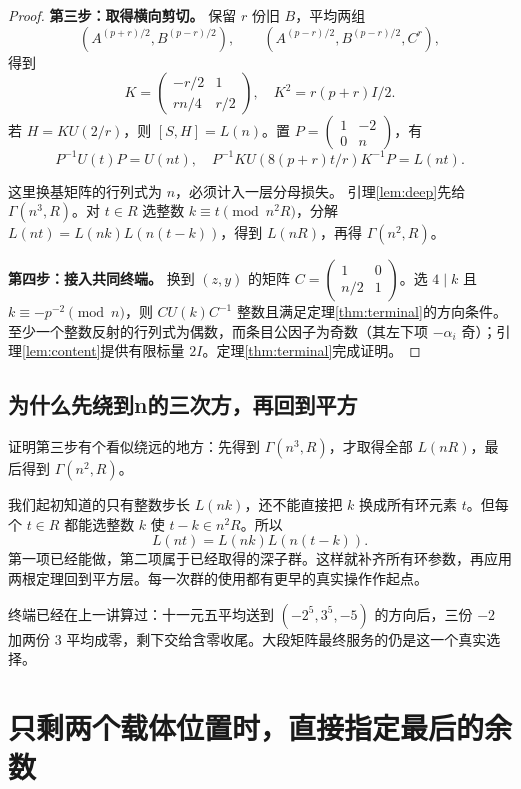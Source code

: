 \documentclass[11pt,a4paper,oneside,openany]{book}
\theoremstyle{definition}
\numberwithin{equation}{chapter}
\begin{document}
\begin{proof}
\par\noindent\textbf{第三步：取得横向剪切。}
保留 $r$ 份旧 $B$，平均两组
\[
(A^{(p+r)/2},B^{(p-r)/2}),\qquad
(A^{(p-r)/2},B^{(p-r)/2},C^r),
\]
得到
\[
K=\begin{pmatrix}-r/2&1\\rn/4&r/2\end{pmatrix},\quad K^2=r(p+r)I/2.
\]
若 $H=KU(2/r)$，则 $[S,H]=L(n)$。置 $P=\left(\begin{smallmatrix}1&-2\\0&n\end{smallmatrix}\right)$，有
\[
P^{-1}U(t)P=U(nt),\quad
P^{-1}KU(8(p+r)t/r)K^{-1}P=L(nt).
\]

这里换基矩阵的行列式为 $n$，必须计入一层分母损失。
引理\ref{lem:deep}先给 $\Gamma(n^3,R)$。对 $t\in R$ 选整数 $k\equiv t\pmod{n^2R}$，分解 $L(nt)=L(nk)L(n(t-k))$，得到 $L(nR)$，再得 $\Gamma(n^2,R)$。

\par\noindent\textbf{第四步：接入共同终端。}
换到 $(z,y)$ 的矩阵 $C=\left(\begin{smallmatrix}1&0\\n/2&1\end{smallmatrix}\right)$。选 $4\mid k$ 且 $k\equiv-p^{-2}\pmod n$，则 $CU(k)C^{-1}$ 整数且满足定理\ref{thm:terminal}的方向条件。至少一个整数反射的行列式为偶数，而条目公因子为奇数（其左下项 $-\alpha_i$ 奇）；引理\ref{lem:content}提供有限标量 $2I$。定理\ref{thm:terminal}完成证明。
\end{proof}

\section{为什么先绕到n的三次方，再回到平方}
证明第三步有个看似绕远的地方：先得到 $\Gamma(n^3,R)$，才取得全部 $L(nR)$，最后得到 $\Gamma(n^2,R)$。

我们起初知道的只有整数步长 $L(nk)$，还不能直接把 $k$ 换成所有环元素 $t$。但每个 $t\in R$ 都能选整数 $k$ 使 $t-k\in n^2R$。所以
\[L(nt)=L(nk)L(n(t-k)).
\]
第一项已经能做，第二项属于已经取得的深子群。这样就补齐所有环参数，再应用两根定理回到平方层。每一次群的使用都有更早的真实操作作起点。

终端已经在上一讲算过：十一元五平均送到 $(-2^5,3^5,-5)$ 的方向后，三份 $-2$ 加两份 $3$ 平均成零，剩下交给含零收尾。大段矩阵最终服务的仍是这一个真实选择。

\chapter{只剩两个载体位置时，直接指定最后的余数}\label{ch:two}
\end{document}
